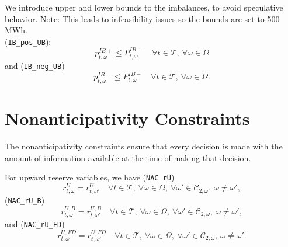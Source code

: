 \documentclass{article}
\begin{document}
We introduce upper and lower bounds to the imbalances, to avoid speculative behavior.
Note: This leads to infeasibility issues so the bounds are set to 500 MWh.\\

(\verb|IB_pos_UB|):\\
\begin{equation} \label{EQ:VPP_IB_MAX}
	p_{t, \omega}^{IB+} \leq P_{t, \omega}^{IB+} \quad \forall t \in \mathcal{T}, \ \forall \omega \in \Omega
\end{equation}
and (\verb|IB_neg_UB|)
\begin{equation} \label{EQ:VPP_IB_MIN}
	p_{t, \omega}^{IB-} \leq P_{t, \omega}^{IB-} \quad \forall t \in \mathcal{T}, \ \forall \omega \in \Omega.
\end{equation}




\section{Nonanticipativity Constraints}
\label{SEC:NonanticipativityConstraints}

The nonanticipativity constraints ensure that every decision is made with the amount of information available at the time of making that decision.



For upward reserve variables, we have (\verb|NAC_rU|)
\begin{equation} \label{EQ:NAC_pVRU}
	r^U_{t, \omega} = r^U_{t, \omega'} \quad \forall t \in \mathcal{T}, \ \forall \omega \in \Omega, \ \forall \omega' \in \mathcal{C}_{2, \omega}, \ \omega \neq \omega',
\end{equation}
(\verb|NAC_rU_B|)
\begin{equation} \label{EQ:NAC_rUB}
	r^{U, B}_{t, \omega} = r^{U, B}_{t, \omega'} \quad \forall t \in \mathcal{T}, \ \forall \omega \in \Omega, \ \forall \omega' \in \mathcal{C}_{2, \omega}, \ \omega \neq \omega',
\end{equation}
and (\verb|NAC_rU_FD|)
\begin{equation} \label{EQ:NAC_rUFD}
	r^{U, FD}_{t, \omega} = r^{U, FD}_{t, \omega'} \quad \forall t \in \mathcal{T}, \ \forall \omega \in \Omega, \ \forall \omega' \in \mathcal{C}_{2, \omega}, \ \omega \neq \omega'.
\end{equation}
\end{document}
